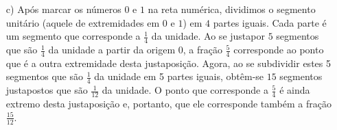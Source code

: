 \documentclass[10 pt,usenames,dvipsnames, oneside]{article}
\begin{document}
\begin{solucao}
\begin{enumerate}
\begin{center}
          \end{center}


\end{enumerate} %
%
\begin{enumerate}

    \item[c)] Após marcar os números       $0$       e       $1$       na reta
numérica, dividimos o segmento unitário (aquele de extremidades em       $0$
  e       $1$) em       $4$       partes iguais. Cada parte é um segmento que
corresponde a       $\frac{1}{4}$       da unidade. Ao se justapor       $5$
  segmentos que são       $\frac{1}{4}$       da unidade a partir da origem 0, a
fração       $\frac{5}{4}$       corresponde ao ponto que é a outra extremidade
desta justaposição. Agora, ao se subdividir estes 5 segmentos que são
$\frac{1}{4}$       da unidade em 5 partes iguais, obtêm-se       $15$
segmentos justapostos que são       $\frac{1}{12}$       da unidade. O ponto que
corresponde a       $\frac{5}{4}$       é ainda extremo desta justaposição e,
portanto, que ele corresponde também a fração       $\frac{15}{12}$.



\begin{center}

\end{center}
\end{enumerate}
\end{solucao}
\end{document}
